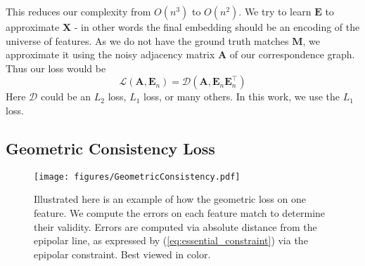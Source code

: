 \documentclass[10pt,twocolumn,letterpaper]{article}
\newcommand{\mat}[1]{\mathbf{#1}}
\begin{document}
This reduces our complexity from $O(n^3)$ to $O(n^2)$.
We try to learn $\mat{E}$ to approximate $\mat{X}$ - in other words the final embedding should be an encoding of the universe of features. As we do not have the ground truth matches $\mat{M}$, we approximate it using the noisy adjacency matrix $\mat{A}$ of our correspondence graph. Thus our loss would be 
\begin{equation}
\mathcal{L}(\mat{A}, \mat{E}_n) = \mathcal{D}(\mat{A}, \mat{E}_n\mat{E}_n^\top)
\end{equation}
Here $\mathcal{D}$ could be an $L_2$ loss, $L_1$ loss, or many others. In this work, we use the $L_1$ loss. 

\subsection{Geometric Consistency Loss}

\begin{figure}[t]
\begin{center}
  \texttt{[image: figures/GeometricConsistency.pdf]}
\end{center}
  \caption{
    Illustrated here is an example of how the geometric loss on one feature.  
    We compute the errors on each feature match to determine their validity.
    Errors are computed via absolute distance from the epipolar line, as expressed by (\ref{eq:essential_constraint}) via the epipolar constraint.
    Best viewed in color.
  }
\label{fig:geoconsist}
\label{fig:onecol}
\end{figure}
\end{document}
